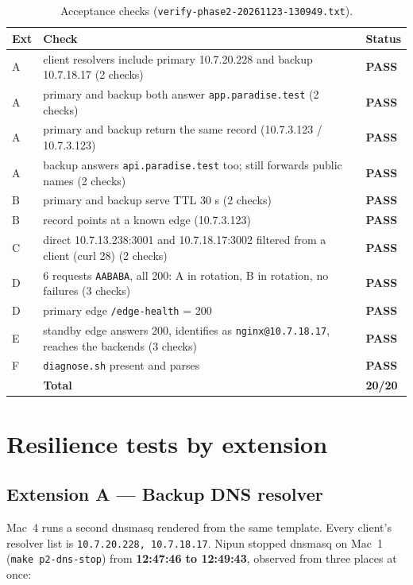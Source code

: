 \documentclass[11pt,a4paper]{article}
\newcommand{\pass}{\textcolor{lmGreen}{\textbf{PASS}}}
\begin{document}
\begin{table}[H]
\centering
\caption{Acceptance checks (\texttt{verify-phase2-20261123-130949.txt}).}
{\small
\begin{tabular}{@{}L{0.6cm}L{11.6cm}L{1.4cm}@{}}
\toprule
\textbf{Ext} & \textbf{Check} & \textbf{Status} \\
\midrule
A & client resolvers include primary 10.7.20.228 and backup 10.7.18.17 (2 checks) & \pass \\
A & primary and backup both answer \texttt{app.paradise.test} (2 checks) & \pass \\
A & primary and backup return the same record (10.7.3.123 / 10.7.3.123) & \pass \\
A & backup answers \texttt{api.paradise.test} too; still forwards public names (2 checks) & \pass \\
B & primary and backup serve TTL 30 s (2 checks) & \pass \\
B & record points at a known edge (10.7.3.123) & \pass \\
C & direct 10.7.13.238:3001 and 10.7.18.17:3002 filtered from a client (curl 28) (2 checks) & \pass \\
D & 6 requests \texttt{AABABA}, all 200: A in rotation, B in rotation, no failures (3 checks) & \pass \\
D & primary edge \texttt{/edge-health} = 200 & \pass \\
E & standby edge answers 200, identifies as \texttt{nginx@10.7.18.17}, reaches the backends (3 checks) & \pass \\
F & \texttt{diagnose.sh} present and parses & \pass \\
\midrule
 & \textbf{Total} & \textbf{20/20} \\
\bottomrule
\end{tabular}}
\end{table}

\section{Resilience tests by extension}

\subsection{Extension A --- Backup DNS resolver}
Mac~4 runs a second dnsmasq rendered from the same template. Every client's resolver list is
\texttt{10.7.20.228, 10.7.18.17}. Nipun stopped dnsmasq on Mac~1 (\texttt{make p2-dns-stop}) from
\textbf{12:47:46 to 12:49:43}, observed from three places at once:
\end{document}
